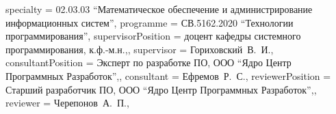 {    specialty          = {02.03.03 \enquote{Математическое обеспечение и администрирование информационных систем}},
    programme          = {СВ.5162.2020 \enquote{Технологии программирования}},
    supervisorPosition = {доцент кафедры системного программирования, к.ф.-м.н.,},
    supervisor         = {Гориховский~В.~И.},
    consultantPosition = {Эксперт по разработке ПО, ООО ``Ядро Центр Программных Разработок'',},
    consultant         = {Ефремов~Р.~С.},
    reviewerPosition   = {Старший разработчик ПО, ООО ``Ядро Центр Программных Разработок'',},
    reviewer           = {Черепонов~А.~П.},
}
%
